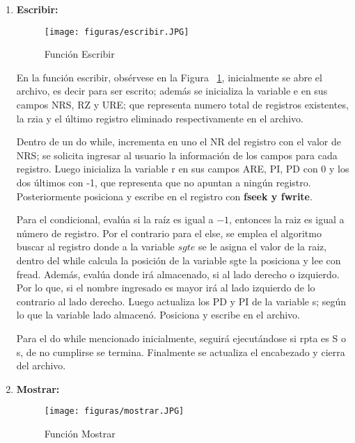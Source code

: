 \documentclass[10pt,conference]{IEEEtran}
\begin{document}
\begin{enumerate}[]
    \item {\textbf{Escribir:}}
       
         \begin{figure}[H]
            \begin{center}
            \texttt{[image: figuras/escribir.JPG]}
            \caption{Función Escribir}
             \label{fescribir} 
             \end{center}
        \end{figure}
        
        \par En la función escribir, obsérvese en la Figura ~\ref{fescribir}, inicialmente se abre el archivo, es decir para ser escrito; además se inicializa la variable e en sus campos NRS, RZ y URE; que representa numero total de registros existentes, la rzia y el último registro eliminado respectivamente en el archivo.
        
        Dentro de un do while, incrementa en uno el NR del registro con el valor de NRS; se solicita ingresar al usuario la información de los campos para cada registro. Luego inicializa la variable r en sus campos ARE, PI, PD con 0 y los dos últimos con -1, que representa que no apuntan a ningún registro. Posteriormente posiciona y escribe en el registro con \textbf{fseek y fwrite}.
        
        Para el condicional, evalúa si la raíz es igual a $-1$, entonces la raiz es igual a número de registro. Por el contrario para el else, se emplea el algoritmo buscar al registro donde a la variable $sgte$ se le asigna el valor de la raiz, dentro del while calcula la posición de la variable sgte la posiciona y lee con fread.
        Además, evalúa donde irá almacenado, si al lado derecho o izquierdo. Por lo que, si el nombre ingresado es mayor irá al lado izquierdo de lo contrario al lado derecho.
        Luego actualiza los PD y PI de la variable s; según lo que la variable lado almacenó. Posiciona y escribe en el archivo.

        Para el do while mencionado inicialmente, seguirá ejecutándose si rpta es S o s, de no cumplirse se termina. Finalmente se actualiza el encabezado y cierra del archivo.
        
    \item {\textbf{Mostrar:}}
        \begin{figure}[H]
            \begin{center}
            \texttt{[image: figuras/mostrar.JPG]}
            \caption{Función Mostrar}
             \label{fmostrar} 
             \end{center}
        \end{figure}
        

\end{enumerate}
\end{document}
